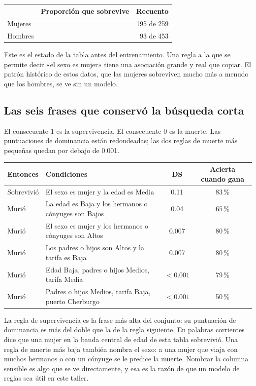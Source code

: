 \documentclass[11pt]{article}
\newcommand{\track}[2]{%
  \begin{tikzpicture}[baseline=-0.15ex]
    \fill[ebdtrack] (0,0) rectangle (5.55,0.20);
    \fill[#2] (0,0) rectangle ({5.55*(#1)},0.20);
  \end{tikzpicture}%
}
\newcommand{\pct}[1]{\mbox{#1\,\%}}
\begin{document}
\begin{table}[H]
\centering
\begin{tabular}{@{}l c r@{}}
\toprule
 & Proporción que sobrevive & Recuento \\
\midrule
Mujeres & \track{0.753}{ebdwomen} & 195 de 259 \\
Hombres & \track{0.205}{ebdmen} & 93 de 453 \\
\bottomrule
\end{tabular}
\end{table}

\noindent
Este es el estado de la tabla antes del entrenamiento. Una regla a la que se permite decir «el sexo es mujer» tiene una asociación grande y real que copiar. El patrón histórico de estos datos, que las mujeres sobreviven mucho más a menudo que los hombres, se ve sin un modelo.

\subsection{Las seis frases que conservó la búsqueda corta}

El consecuente 1 es la supervivencia. El consecuente 0 es la muerte. Las puntuaciones de dominancia están redondeadas; las dos reglas de muerte más pequeñas quedan por debajo de 0.001.

\begin{table}[H]
\centering
\small
\begin{tabularx}{\textwidth}{@{}l Y c c@{}}
\toprule
Entonces & Condiciones & DS & Acierta cuando gana \\
\midrule
{}
Sobrevivió & El sexo es mujer y la edad es Media & 0.11 & \pct{83} \\
Murió & La edad es Baja y los hermanos o cónyuges son Bajos & 0.04 & \pct{65} \\
Murió & El sexo es mujer y los hermanos o cónyuges son Altos & 0.007 & \pct{80} \\
Murió & Los padres o hijos son Altos y la tarifa es Baja & 0.007 & \pct{80} \\
Murió & Edad Baja, padres o hijos Medios, tarifa Media & \(<0.001\) & \pct{79} \\
Murió & Padres o hijos Medios, tarifa Baja, puerto Cherburgo & \(<0.001\) & \pct{50} \\
\bottomrule
\end{tabularx}
\end{table}

La regla de supervivencia es la frase más alta del conjunto: su puntuación de dominancia es más del doble que la de la regla siguiente. En palabras corrientes dice que una mujer en la banda central de edad de esta tabla sobrevivió. Una regla de muerte más baja también nombra el sexo: a una mujer que viaja con muchos hermanos o con un cónyuge se le predice la muerte. Nombrar la columna sensible es algo que se ve directamente, y esa es la razón de que un modelo de reglas sea útil en este taller.
\end{document}
